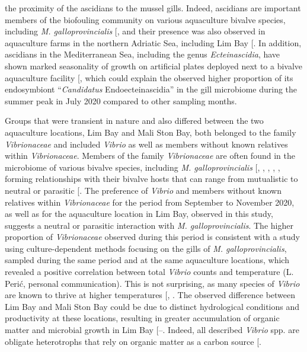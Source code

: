 \documentclass[
  12 pt,
]{article}
\begin{document}
the proximity of the ascidians to the mussel gills. Indeed, ascidians are important members of the biofouling community on various aquaculture bivalve species, including \emph{M. galloprovincialis} {[}\citeproc{ref-Alvanou2024}{100}{]}, and their presence was also observed in aquaculture farms in the northern Adriatic Sea, including Lim Bay {[}\citeproc{ref-Majnaric2022}{101}{]}. In addition, ascidians in the Mediterranean Sea, including the genus \emph{Ecteinascidia}, have shown marked seasonality of growth on artificial plates deployed next to a bivalve aquaculture facility {[}\citeproc{ref-Casso2018}{102}{]}, which could explain the observed higher proportion of its endosymbiont ``\emph{Candidatus} Endoecteinascidia'' in the gill microbiome during the summer peak in July 2020 compared to other sampling months.

Groups that were transient in nature and also differed between the two aquaculture locations, Lim Bay and Mali Ston Bay, both belonged to the family \emph{Vibrionaceae} and included \emph{Vibrio} as well as members without known relatives within \emph{Vibrionaceae}. Members of the family \emph{Vibrionaceae} are often found in the microbiome of various bivalve species, including \emph{M. galloprovincialis} {[}, , , , \citeproc{ref-Peruzzo2026}{23}{]}, forming relationships with their bivalve hosts that can range from mutualistic to neutral or parasitic {[}\citeproc{ref-Destoumieux-Garzon2020}{103}{]}. The preference of \emph{Vibrio} and members without known relatives within \emph{Vibrionaceae} for the period from September to November 2020, as well as for the aquaculture location in Lim Bay, observed in this study, suggests a neutral or parasitic interaction with \emph{M. galloprovincialis}. The higher proportion of \emph{Vibrionaceae} observed during this period is consistent with a study using culture-dependent methods focusing on the gills of \emph{M. galloprovincialis}, sampled during the same period and at the same aquaculture locations, which revealed a positive correlation between total \emph{Vibrio} counts and temperature (L. Perić, personal communication). This is not surprising, as many species of \emph{Vibrio} are known to thrive at higher temperatures {[}, \citeproc{ref-Sheikh2022}{104}{]}. The observed difference between Lim Bay and Mali Ston Bay could be due to distinct hydrological conditions and productivity at these locations, resulting in greater accumulation of organic matter and microbial growth in Lim Bay {[}--\citeproc{ref-Skejic2015}{42}{]}. Indeed, all described \emph{Vibrio} spp. are obligate heterotrophs that rely on organic matter as a carbon source {[}\citeproc{ref-Zhang2018a}{105}{]}.
\end{document}
